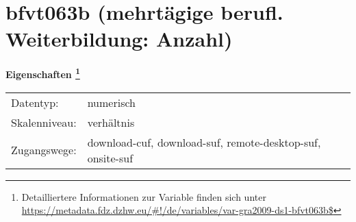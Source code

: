
    \setcounter{footnote}{0}

    \vspace*{-1.8cm}
	\section{bfvt063b (mehrtägige berufl. Weiterbildung: Anzahl)}
	\label{section:bfvt063b}



    \vspace*{0.5cm}
    \noindent\textbf{Eigenschaften
	\footnote{Detailliertere Informationen zur Variable finden sich unter
		\url{https://metadata.fdz.dzhw.eu/\#!/de/variables/var-gra2009-ds1-bfvt063b$}}}\\
	\begin{tabularx}{\hsize}{@{}lX}
	Datentyp: & numerisch \\
	Skalenniveau: & verhältnis \\
	Zugangswege: &
	  download-cuf, 
	  download-suf, 
	  remote-desktop-suf, 
	  onsite-suf
 \\
    \end{tabularx}



